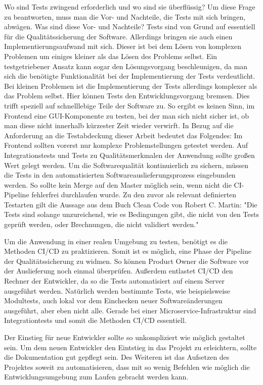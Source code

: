 Wo sind Tests zwingend erforderlich und wo sind sie überflüssig? Um diese Frage zu beantworten, muss
man die Vor- und Nachteile, die Tests mit sich bringen, abwägen. Was sind diese Vor- und Nachteile?
Tests sind von Grund auf essentiell für die Qualitätssicherung der Software. Allerdings bringen sie auch
einen Implementierungsaufwand mit sich. Dieser ist bei dem Lösen von komplexen Problemen um einiges kleiner
als das Lösen des Problems selbst. Ein testgetriebener Ansatz kann sogar den Lösungsvorgang beschleunigen,
da man sich die benötigte Funktionalität bei der Implementierung der Tests verdeutlicht.
Bei kleinen Problemen ist die Implementierung der Tests allerdings komplexer als das Problem selbst.
Hier können Tests den Entwicklungsvorgang bremsen. Dies trifft speziell auf schnelllebige Teile der 
Software zu. So ergibt es keinen Sinn, im Frontend eine GUI-Komponente zu testen, bei der man sich nicht sicher ist,
ob man diese nicht innerhalb kürzester Zeit wieder verwirft. In Bezug
auf die Anforderung an die Testabdeckung dieser Arbeit bedeutet das Folgendes:
Im Frontend sollten vorerst nur komplexe Problemstellungen getestet werden. Auf Integrationstests und Tests
zu Qualitätsmerkmalen der Anwendung sollte großen Wert gelegt werden. Um die Softwarequalität kontinuierlich
zu sichern, müssen die Tests in den automatisierten Softwareauslieferungsprozess eingebunden werden. 
So sollte kein Merge auf den Master möglich sein, wenn nicht die CI-Pipeline fehlerfrei durchlaufen wurde.
Zu den zuvor als relevant definierten Testarten gilt die Aussage aus dem Buch Clean Code von Robert C. Martin:
"Die Tests sind solange unzureichend, wie es Bedingungen gibt, die nicht von den Tests geprüft werden,
oder Brechnungen, die nicht validiert werden."\cite[S. 370]{CleanCode}

Um die Anwendung in einer realen Umgebung zu testen, benötigt es die Methoden CI/CD
zu praktizieren. Somit ist es möglich, eine Phase der Pipeline der Qualitätssicherung zu widmen.
So können Product Owner die Software vor der Auslieferung noch einmal überprüfen. Außerdem
entlastet CI/CD den Rechner der Entwickler, da so die Tests automatisiert auf einem Server
ausgeführt werden. Natürlich werden bestimmte Tests, wie beispielsweise Modultests, auch 
lokal vor dem Einchecken neuer Softwareänderungen ausgeführt, aber eben nicht alle. Gerade
bei einer Microservice-Infrastruktur sind Integrationtests und somit die Methoden CI/CD essentiell.

Der Einstieg für neue Entwickler sollte so unkompliziert wie möglich gestaltet sein. Um dem neuen
Entwickler den Eintstieg in das Projekt zu erleichtern, sollte die Dokumentation gut gepflegt sein.
Des Weiteren ist das Aufsetzen des Projektes soweit zu automatisieren, dass mit so wenig Befehlen
wie möglich die Entwicklungsumgebung zum Laufen gebracht werden kann.

